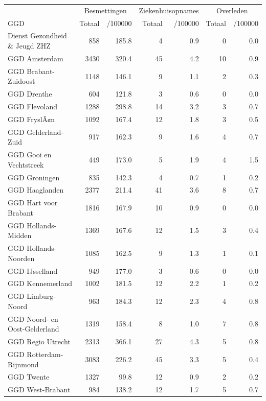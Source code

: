 \documentclass[
  english,
  man,floatsintext]{apa6}
\begin{document}
\begin{table}
\centering\begingroup\fontsize{10}{12}\selectfont

\begin{threeparttable}
\begin{tabular}{lrrrrrr}
\toprule
\multicolumn{1}{c}{ } & \multicolumn{2}{c}{Besmettingen} & \multicolumn{2}{c}{Ziekenhuisopnames} & \multicolumn{2}{c}{Overleden} \\
\cmidrule(l{3pt}r{3pt}){2-3} \cmidrule(l{3pt}r{3pt}){4-5} \cmidrule(l{3pt}r{3pt}){6-7}
GGD & Totaal & /100000 & Totaal & /100000 & Totaal & /100000\\
\midrule
Dienst Gezondheid \& Jeugd ZHZ & 858 & 185.8 & 4 & 0.9 & 0 & 0.0\\
GGD Amsterdam & 3430 & 320.4 & 45 & 4.2 & 10 & 0.9\\
GGD Brabant-Zuidoost & 1148 & 146.1 & 9 & 1.1 & 2 & 0.3\\
GGD Drenthe & 604 & 121.8 & 3 & 0.6 & 0 & 0.0\\
GGD Flevoland & 1288 & 298.8 & 14 & 3.2 & 3 & 0.7\\
GGD FryslÃ¢n & 1092 & 167.4 & 12 & 1.8 & 3 & 0.5\\
GGD Gelderland-Zuid & 917 & 162.3 & 9 & 1.6 & 4 & 0.7\\
GGD Gooi en Vechtstreek & 449 & 173.0 & 5 & 1.9 & 4 & 1.5\\
GGD Groningen & 835 & 142.3 & 4 & 0.7 & 1 & 0.2\\
GGD Haaglanden & 2377 & 211.4 & 41 & 3.6 & 8 & 0.7\\
GGD Hart voor Brabant & 1816 & 167.9 & 10 & 0.9 & 0 & 0.0\\
GGD Hollands-Midden & 1369 & 167.6 & 12 & 1.5 & 3 & 0.4\\
GGD Hollands-Noorden & 1085 & 162.5 & 9 & 1.3 & 1 & 0.1\\
GGD IJsselland & 949 & 177.0 & 3 & 0.6 & 0 & 0.0\\
GGD Kennemerland & 1002 & 181.5 & 12 & 2.2 & 1 & 0.2\\
GGD Limburg-Noord & 963 & 184.3 & 12 & 2.3 & 4 & 0.8\\
GGD Noord- en Oost-Gelderland & 1319 & 158.4 & 8 & 1.0 & 7 & 0.8\\
GGD Regio Utrecht & 2313 & 366.1 & 27 & 4.3 & 5 & 0.8\\
GGD Rotterdam-Rijnmond & 3083 & 226.2 & 45 & 3.3 & 5 & 0.4\\
GGD Twente & 1327 & 99.8 & 12 & 0.9 & 2 & 0.2\\
GGD West-Brabant & 984 & 138.2 & 12 & 1.7 & 5 & 0.7\\

\end{tabular}
\end{threeparttable}
\end{table}
\end{document}
